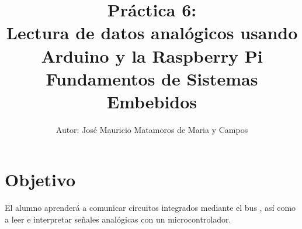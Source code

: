 \documentclass[letterpaper,10.5pt]{article}
\author{\footnotesize Autor: José Mauricio Matamoros de Maria y Campos}
\title{Práctica 6:\\Lectura de datos analógicos usando Arduino y la Raspberry Pi\\
{\large Fundamentos de Sistemas Embebidos}}
\date{}
\begin{document}
\maketitle

\section{Objetivo}%
\label{sec:objective}
El alumno aprenderá a comunicar circuitos integrados mediante el bus \IIC{},
así como a leer e interpretar señales analógicas con un microcontrolador.







\appendix


\end{document}

